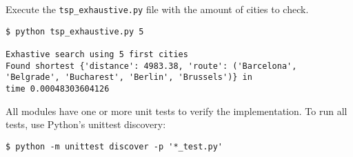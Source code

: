 \documentclass{article}
\begin{document}
Execute the \texttt{tsp\_exhaustive.py} file with the amount of cities to check.

\begin{verbatim}
$ python tsp_exhaustive.py 5

Exhastive search using 5 first cities
Found shortest {'distance': 4983.38, 'route': ('Barcelona',
'Belgrade', 'Bucharest', 'Berlin', 'Brussels')} in
time 0.00048303604126
\end{verbatim}

\noindent All modules have one or more unit tests to verify the implementation. To run all tests, use Python's unittest discovery:

\begin{verbatim}
$ python -m unittest discover -p '*_test.py'
\end{verbatim}
\end{document}
